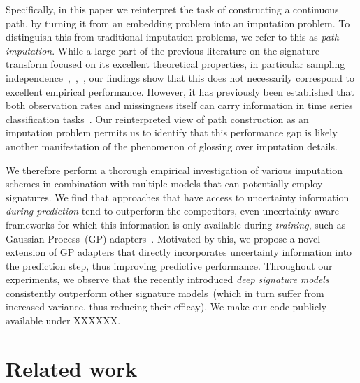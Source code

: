 \documentclass{article}
\begin{document}
Specifically, in this paper we reinterpret the task of
constructing a continuous path, by turning it from an embedding problem
into an imputation problem. To distinguish this from traditional
imputation problems, we refer to this as \emph{path imputation}.
%
While a large part of the previous literature on the signature transform
focused on its excellent theoretical properties, in particular sampling
independence~\cite[Proposition A.7]{kidger2019deep},~\cite{signatorydocumentation},~\cite[Section 2]{toth2019gp}, our findings show that this does not
necessarily correspond to excellent empirical performance.
%
However, it has previously been established that both observation rates
and missingness itself can carry information in time series
classification tasks~\citep{rubin1976inference, gelman2007dataanalysis}.
%
Our reinterpreted view of path construction as an imputation problem
permits us to identify that this performance gap is likely another
manifestation of the phenomenon of glossing over imputation details.

We therefore perform a thorough empirical investigation of various
imputation schemes in combination with multiple models that can potentially
employ signatures. We find that approaches that have access to
uncertainty information \emph{during prediction} tend to outperform the
competitors, even uncertainty-aware frameworks for which this
information is only available during \emph{training}, such as Gaussian
Process~(GP) adapters~\citep{li2016scalable, futoma2017mgp}.
%
Motivated by this, we propose a novel extension of GP adapters that
directly incorporates uncertainty information into the prediction step,
thus improving predictive performance.
Throughout our experiments, we observe that the recently introduced
\emph{deep signature models}~\citep{kidger2019deep} consistently
outperform other signature models~(which in turn suffer from increased
variance, thus reducing their efficay).
%
We make our code publicly available under XXXXXX.


\section{Related work}
\end{document}
